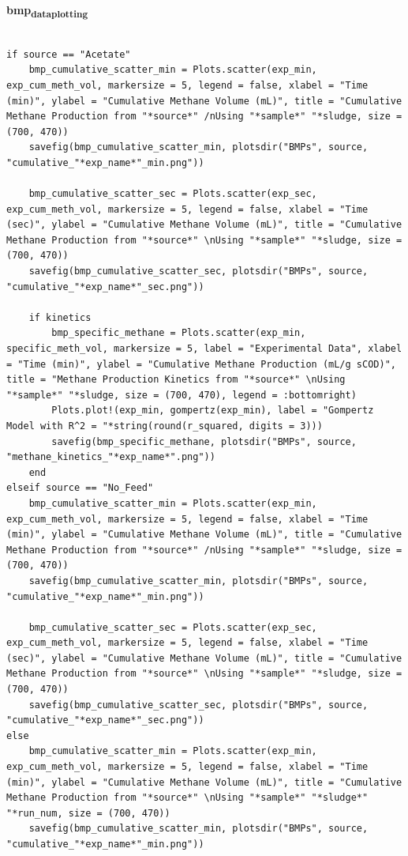 \documentclass[11pt]{article}
\begin{document}
\textbf{bmp\textsubscript{data}\textsubscript{plotting}}
\begin{verbatim}

if source == "Acetate"
    bmp_cumulative_scatter_min = Plots.scatter(exp_min, exp_cum_meth_vol, markersize = 5, legend = false, xlabel = "Time (min)", ylabel = "Cumulative Methane Volume (mL)", title = "Cumulative Methane Production from "*source*" /nUsing "*sample*" "*sludge, size = (700, 470))
    savefig(bmp_cumulative_scatter_min, plotsdir("BMPs", source, "cumulative_"*exp_name*"_min.png"))

    bmp_cumulative_scatter_sec = Plots.scatter(exp_sec, exp_cum_meth_vol, markersize = 5, legend = false, xlabel = "Time (sec)", ylabel = "Cumulative Methane Volume (mL)", title = "Cumulative Methane Production from "*source*" \nUsing "*sample*" "*sludge, size = (700, 470))
    savefig(bmp_cumulative_scatter_sec, plotsdir("BMPs", source, "cumulative_"*exp_name*"_sec.png"))

    if kinetics
        bmp_specific_methane = Plots.scatter(exp_min, specific_meth_vol, markersize = 5, label = "Experimental Data", xlabel = "Time (min)", ylabel = "Cumulative Methane Production (mL/g sCOD)", title = "Methane Production Kinetics from "*source*" \nUsing "*sample*" "*sludge, size = (700, 470), legend = :bottomright)
        Plots.plot!(exp_min, gompertz(exp_min), label = "Gompertz Model with R^2 = "*string(round(r_squared, digits = 3)))
        savefig(bmp_specific_methane, plotsdir("BMPs", source, "methane_kinetics_"*exp_name*".png"))
    end
elseif source == "No_Feed"
    bmp_cumulative_scatter_min = Plots.scatter(exp_min, exp_cum_meth_vol, markersize = 5, legend = false, xlabel = "Time (min)", ylabel = "Cumulative Methane Volume (mL)", title = "Cumulative Methane Production from "*source*" /nUsing "*sample*" "*sludge, size = (700, 470))
    savefig(bmp_cumulative_scatter_min, plotsdir("BMPs", source, "cumulative_"*exp_name*"_min.png"))

    bmp_cumulative_scatter_sec = Plots.scatter(exp_sec, exp_cum_meth_vol, markersize = 5, legend = false, xlabel = "Time (sec)", ylabel = "Cumulative Methane Volume (mL)", title = "Cumulative Methane Production from "*source*" \nUsing "*sample*" "*sludge, size = (700, 470))
    savefig(bmp_cumulative_scatter_sec, plotsdir("BMPs", source, "cumulative_"*exp_name*"_sec.png"))
else
    bmp_cumulative_scatter_min = Plots.scatter(exp_min, exp_cum_meth_vol, markersize = 5, legend = false, xlabel = "Time (min)", ylabel = "Cumulative Methane Volume (mL)", title = "Cumulative Methane Production from "*source*" \nUsing "*sample*" "*sludge*" "*run_num, size = (700, 470))
    savefig(bmp_cumulative_scatter_min, plotsdir("BMPs", source, "cumulative_"*exp_name*"_min.png"))


\end{verbatim}
\end{document}
